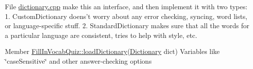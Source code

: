 \label{todo__todo000001}
\hypertarget{todo__todo000001}{}
 
\begin{DoxyDescription}
\item[File \hyperlink{dictionary_8cpp}{dictionary.cpp} ]make this an interface, and then implement it with two types: 1. CustomDictionary doens't worry about any error checking, syncing, word lists, or language-\/specific stuff. 2. StandardDictionary makes sure that all the words for a particular language are consistent, tries to help with style, etc. 
\end{DoxyDescription}

\label{todo__todo000003}
\hypertarget{todo__todo000003}{}
 
\begin{DoxyDescription}
\item[Member \hyperlink{classFillInVocabQuiz_affe1c2da58f58e96643a5d95bf3a6e47}{FillInVocabQuiz::loadDictionary}(\hyperlink{classDictionary}{Dictionary} dict) ]Variables like \char`\"{}caseSensitive\char`\"{} and other answer-\/checking options 
\end{DoxyDescription}